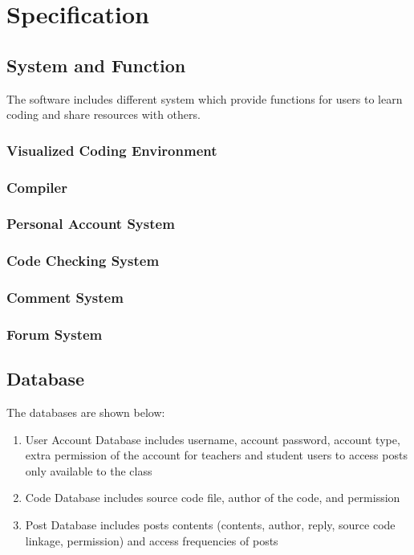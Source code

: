 \chapter{Specification}
\section{System and Function}
The software includes different system which provide functions for users to learn coding and share resources with others.
\subsection{Visualized Coding Environment}
	
\subsection{Compiler}
\subsection{Personal Account System}
	
\subsection{Code Checking System}
	
\subsection{Comment System}
	
\subsection{Forum System}
	
\section{Database}
The databases are shown below:
\begin{enumerate}
	\item User Account Database includes username, account password, account type, extra permission of the account for teachers and student users to access posts only available to the class
	\item Code Database includes source code file, author of the code, and permission
	\item Post Database includes posts contents (contents, author, reply, source code linkage, permission) and access frequencies of posts
\end{enumerate}

